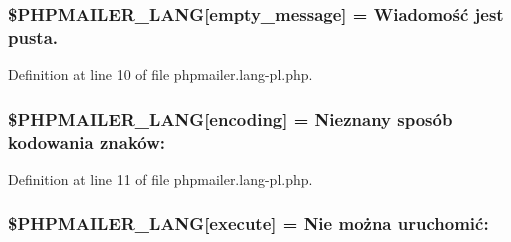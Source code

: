 \subsubsection[{\texorpdfstring{\$\+P\+H\+P\+M\+A\+I\+L\+E\+R\+\_\+\+L\+A\+NG}{$PHPMAILER_LANG}}]{\setlength{\rightskip}{0pt plus 5cm}\$P\+H\+P\+M\+A\+I\+L\+E\+R\+\_\+\+L\+A\+NG\mbox{[}\textquotesingle{}empty\+\_\+message\textquotesingle{}\mbox{]} = \textquotesingle{}Wiadomość jest pusta.\textquotesingle{}}\hypertarget{phpmailer_8lang-pl_8php_a33772099f637c9d6c2cd7425e0e37fed}{}\label{phpmailer_8lang-pl_8php_a33772099f637c9d6c2cd7425e0e37fed}


Definition at line 10 of file phpmailer.\+lang-\/pl.\+php.

\subsubsection[{\texorpdfstring{\$\+P\+H\+P\+M\+A\+I\+L\+E\+R\+\_\+\+L\+A\+NG}{$PHPMAILER_LANG}}]{\setlength{\rightskip}{0pt plus 5cm}\$P\+H\+P\+M\+A\+I\+L\+E\+R\+\_\+\+L\+A\+NG\mbox{[}\textquotesingle{}encoding\textquotesingle{}\mbox{]} = \textquotesingle{}Nieznany sposób kodowania znaków\+: \textquotesingle{}}\hypertarget{phpmailer_8lang-pl_8php_a817f7283f3d54c970a0c10305cc668cc}{}\label{phpmailer_8lang-pl_8php_a817f7283f3d54c970a0c10305cc668cc}


Definition at line 11 of file phpmailer.\+lang-\/pl.\+php.

\subsubsection[{\texorpdfstring{\$\+P\+H\+P\+M\+A\+I\+L\+E\+R\+\_\+\+L\+A\+NG}{$PHPMAILER_LANG}}]{\setlength{\rightskip}{0pt plus 5cm}\$P\+H\+P\+M\+A\+I\+L\+E\+R\+\_\+\+L\+A\+NG\mbox{[}\textquotesingle{}execute\textquotesingle{}\mbox{]} = \textquotesingle{}Nie można uruchomić\+: \textquotesingle{}}\hypertarget{phpmailer_8lang-pl_8php_a668217a9563a168f30f2a8548b6ed5a9}{}\label{phpmailer_8lang-pl_8php_a668217a9563a168f30f2a8548b6ed5a9}


